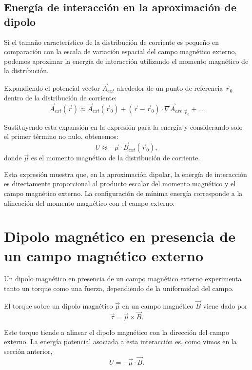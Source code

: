 \documentclass[12pt,a4paper]{book}
\begin{document}
\subsection{Energía de interacción en la aproximación de dipolo}

Si el tamaño característico de la distribución de corriente es pequeño en comparación con la escala de variación espacial del campo magnético externo, podemos aproximar la energía de interacción utilizando el momento magnético de la distribución.

Expandiendo el potencial vector $\vec{A}_{ext}$ alrededor de un punto de referencia $\vec{r}_0$ dentro de la distribución de corriente:
\begin{equation}
\vec{A}_{ext}(\vec{r}) \approx \vec{A}_{ext}(\vec{r}_0) + (\vec{r} - \vec{r}_0) \cdot \nabla \vec{A}_{ext}|_{\vec{r}_0} + \ldots
\end{equation}

Sustituyendo esta expansión en la expresión para la energía y considerando solo el primer término no nulo, obtenemos:
\begin{equation}
U \approx -\vec{\mu} \cdot \vec{B}_{ext}(\vec{r}_0),
\end{equation}
donde $\vec{\mu}$ es el momento magnético de la distribución de corriente.

Esta expresión muestra que, en la aproximación dipolar, la energía de interacción es directamente proporcional al producto escalar del momento magnético y el campo magnético externo. La configuración de mínima energía corresponde a la alineación del momento magnético con el campo externo.

\section{Dipolo magnético en presencia de un campo magnético externo}

Un dipolo magnético en presencia de un campo magnético externo experimenta tanto un torque como una fuerza, dependiendo de la uniformidad del campo.

El torque sobre un dipolo magnético $\vec{\mu}$ en un campo magnético $\vec{B}$ viene dado por
\begin{equation}
\vec{\tau} = \vec{\mu} \times \vec{B}.
\end{equation}

Este torque tiende a alinear el dipolo magnético con la dirección del campo externo. La energía potencial asociada a esta interacción es, como vimos en la sección anterior,
\begin{equation}
U = -\vec{\mu} \cdot \vec{B}.
\end{equation}
\end{document}
